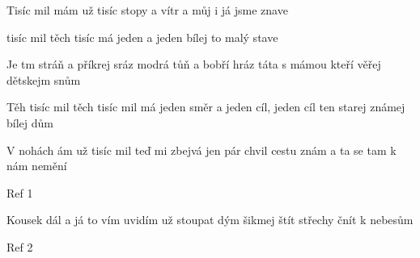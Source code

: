 \begin{TEXT}{Tisíc mil}
\SLOKA {} mám už tisíc 
stopy  a vítr 
a můj  i já jsme  znave

\REFREN {} tisíc mil těch tisíc 
má jeden  a jeden 
bílej  to malý  stave

\SLOKA Je tm stráň a příkrej sráz
modrá tůň a bobří hráz
táta s mámou kteří věřej dětskejm snům

\REFREN Těh tisíc mil těch tisíc mil
má jeden směr a jeden cíl,
jeden cíl ten starej známej bílej dům

\SLOKA V nohách ám už tisíc mil
teď mi zbejvá jen pár chvil
cestu znám a ta se tam k nám nemění

\REFREN Ref 1

\SLOKA Kousek dál a já to vím uvidím už stoupat dým
šikmej štít střechy čnít k nebesům 

\REFREN Ref 2
\end{TEXT}